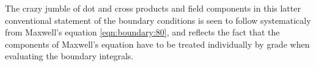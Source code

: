 The crazy jumble of dot and cross products and field components in this latter conventional statement of the boundary conditions is seen to follow systematicaly from Maxwell's equation \cref{eqn:boundary:80}, and reflects the fact that the components of Maxwell's equation have to be treated individually by grade when evaluating the boundary integrals.
